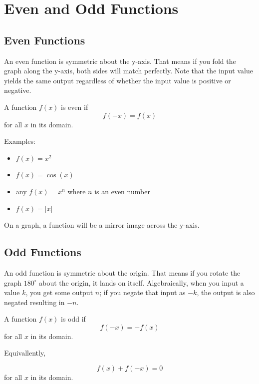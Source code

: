 \section{Even and Odd Functions}


\subsection{Even Functions}

An even function is symmetric about the y-axis. That means if you fold the graph along the y-axis, both sides will match perfectly. Note that the input value yields the same output regardless of whether the input value is positive or negative. 


\begin{mdframed}[style=important, frametitle={Even Functions}]

A function \( f(x) \) is even if  
\[
f(-x) = f(x)
\]  
for all \( x \) in its domain.
\end{mdframed}
Examples:
\begin{itemize}
  \item \( f(x) = x^2 \)  
  \item \( f(x) = \cos(x) \)  
  \item any \( f(x) = x^n \) where \( n \) is an even number
  \item \( f(x) = |x| \)
\end{itemize}

On a graph, a function will be a mirror image across the y-axis.

\subsection{Odd Functions}

An odd function is symmetric about the origin. That means if you rotate the graph $180^\circ$ about the origin, it lands on itself. Algebraically, when you input a value $k$, you get some output $n$; if you negate that input as $-k$, the output is also negated resulting in $-n$.


\begin{mdframed}[style=important, frametitle={Odd Functions}]

A function \( f(x) \) is odd if  
\[
f(-x) = -f(x)
\]
for all \( x \) in its domain.

Equivallently, 

\[ f(x) + f(-x) = 0 \]
for all \( x \) in its domain.
\end{mdframed}

